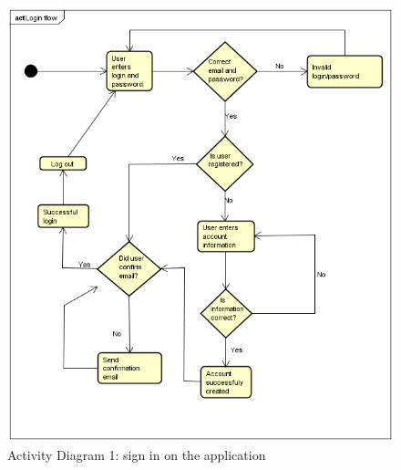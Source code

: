 \documentclass[paper=a4, fontsize=12pt,DIV=14]{scrartcl}    %
\begin{document}
		                \begin{figure}[!htbp]
		                    \center
		                    \includegraphics[scale=1]{img/act_login.png}
		                    \caption{Activity Diagram 1: sign in on the application}
		                \end{figure}
		                \newpage
\end{document}
